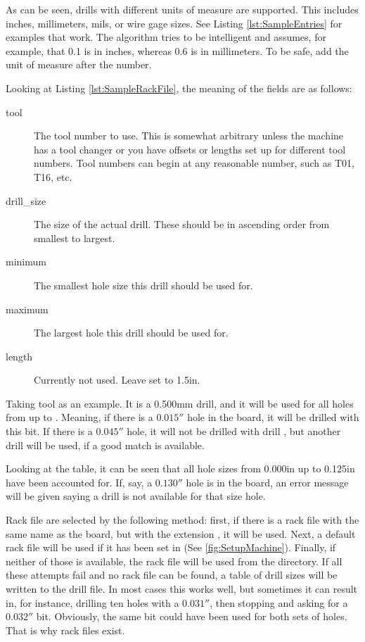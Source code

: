 \documentclass[11pt]{book}
\begin{document}
As can be seen, drills with different units of measure are supported. This includes inches, millimeters, mils, or wire gage sizes. See Listing \ref{lst:SampleEntries} for examples that work. The algorithm tries to be intelligent and assumes, for example, that 0.1 is in inches, whereas 0.6 is in millimeters. To be safe, add the unit of measure after the number.

Looking at Listing \ref{lst:SampleRackFile}, the meaning of the fields are as follows:

\begin{description}
	\item[tool] The tool number to use. This is somewhat arbitrary unless the machine has a tool changer or you have offsets or lengths set up for different tool numbers. Tool numbers can begin at any reasonable number, such as T01, T16, etc.
	\item[drill\_size] The size of the actual drill. These should be in ascending order from smallest to largest.
	\item[minimum] The smallest hole size this drill should be used for.
	\item[maximum] The largest hole this drill should be used for.
	\item[length] Currently not used. Leave set to 1.5in.
\end{description}

Taking tool  as an example. It is a 0.500mm drill, and it will be used for all holes from \code{0.000in} up to \code{0.025in}. Meaning, if there is a $0.015''$ hole in the board, it will be drilled with this bit. If there is a $0.045''$ hole, it will not be drilled with drill , but another drill will be used, if a good match is available.

Looking at the table, it can be seen that all hole sizes from 0.000in up to 0.125in have been accounted for. If, say, a $0.130''$ hole is in the board, an error message will be given saying a drill is not available for that size hole.

Rack file are selected by the following method: first, if there is a rack file with the same name as the board, but with the extension , it will be used. Next, a default rack file will be used if it has been set in  (See \figurename \vref{fig:SetupMachine}). Finally, if neither of those is available, the rack file  will be used from the  directory. If all these attempts fail and no rack file can be found, a table of drill sizes will be written to the drill file. In most cases this works well, but sometimes it can result in, for instance, drilling ten holes with a $0.031''$, then stopping and asking for a $0.032''$ bit. Obviously, the same bit could have been used for both sets of holes. That is why rack files exist.
\end{document}
